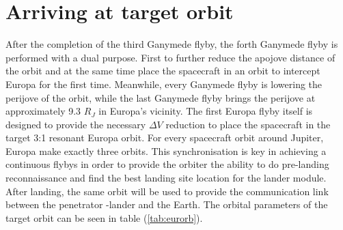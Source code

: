 \section{Arriving at target orbit}
After the completion of the third Ganymede flyby, the forth Ganymede flyby is performed with a dual purpose. First to further reduce the apojove distance of the orbit and at the same time place the spacecraft in an orbit to intercept Europa for the first time. Meanwhile, every Ganymede flyby is lowering the perijove of the orbit, while the last Ganymede flyby brings the perijove at approximately 9.3 $R_J$ in Europa's vicinity. The first Europa flyby itself is designed to provide the necessary $\Delta V$ reduction to place the spacecraft in the target 3:1 resonant Europa orbit. For every spacecraft orbit around Jupiter, Europa make exactly three orbits. This synchronisation is key in achieving a continuous flybys in order to provide the orbiter the ability to do pre-landing reconnaissance and find the best landing site location for the lander module. After landing, the same orbit will be used to provide the communication link between the penetrator -lander and the Earth. The orbital parameters of the target orbit can be seen in table (\ref{tab:eurorb}).

